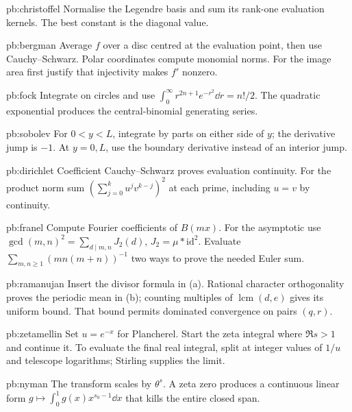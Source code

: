 \begin{hint}{pb:christoffel}
Normalise the Legendre basis and sum its rank-one evaluation kernels. The best constant is the diagonal value.
\end{hint}
\begin{hint}{pb:bergman}
Average $f$ over a disc centred at the evaluation point, then use Cauchy--Schwarz. Polar coordinates compute monomial norms. For the image area first justify that injectivity makes $f'$ nonzero.
\end{hint}
\begin{hint}{pb:fock}
Integrate on circles and use $\int_0^\infty r^{2n+1}e^{-r^2}\dd r=n!/2$. The quadratic exponential produces the central-binomial generating series.
\end{hint}
\begin{hint}{pb:sobolev}
For $0<y<L$, integrate by parts on either side of $y$; the derivative jump is $-1$. At $y=0,L$, use the boundary derivative instead of an interior jump.
\end{hint}
\begin{hint}{pb:dirichlet}
Coefficient Cauchy--Schwarz proves evaluation continuity. For the product norm sum $(\sum_{j=0}^ku^jv^{k-j})^2$ at each prime, including $u=v$ by continuity.
\end{hint}
\begin{hint}{pb:franel}
Compute Fourier coefficients of $B(mx)$. For the asymptotic use $\gcd(m,n)^2=\sum_{d\mid m,n}J_2(d)$, $J_2=\mu*\mathrm{id}^2$. Evaluate $\sum_{m,n\ge1}(mn(m+n))^{-1}$ two ways to prove the needed Euler sum.
\end{hint}
\begin{hint}{pb:ramanujan}
Insert the divisor formula in (a). Rational character orthogonality proves the periodic mean in (b); counting multiples of $\operatorname{lcm}(d,e)$ gives its uniform bound. That bound permits dominated convergence on pairs $(q,r)$.
\end{hint}
\begin{hint}{pb:zetamellin}
Set $u=e^{-x}$ for Plancherel. Start the zeta integral where $\Re s>1$ and continue it. To evaluate the final real integral, split at integer values of $1/u$ and telescope logarithms; Stirling supplies the limit.
\end{hint}
\begin{hint}{pb:nyman}
The transform scales by $\theta^s$. A zeta zero produces a continuous linear form $g\mapsto\int_0^1g(x)x^{s_0-1}\dd x$ that kills the entire closed span.
\end{hint}
